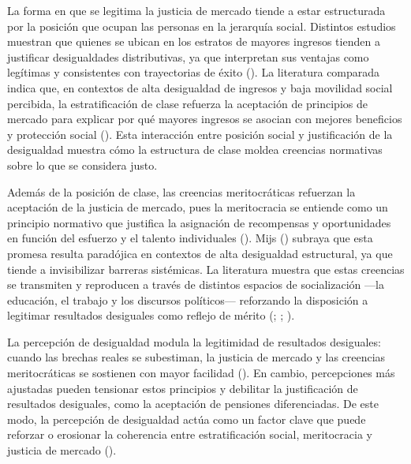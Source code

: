 \documentclass[
  12pt,
  letterpaper,
  DIV=11,
  numbers=noendperiod]{scrartcl}
\begin{document}
La forma en que se legitima la justicia de mercado tiende a estar
estructurada por la posición que ocupan las personas en la jerarquía
social. Distintos estudios muestran que quienes se ubican en los
estratos de mayores ingresos tienden a justificar desigualdades
distributivas, ya que interpretan sus ventajas como legítimas y
consistentes con trayectorias de éxito
(). La literatura
comparada indica que, en contextos de alta desigualdad de ingresos y
baja movilidad social percibida, la estratificación de clase refuerza la
aceptación de principios de mercado para explicar por qué mayores
ingresos se asocian con mejores beneficios y protección social
(). Esta interacción entre
posición social y justificación de la desigualdad muestra cómo la
estructura de clase moldea creencias normativas sobre lo que se
considera justo.

Además de la posición de clase, las creencias meritocráticas refuerzan
la aceptación de la justicia de mercado, pues la meritocracia se
entiende como un principio normativo que justifica la asignación de
recompensas y oportunidades en función del esfuerzo y el talento
individuales (). Mijs
() subraya que esta promesa
resulta paradójica en contextos de alta desigualdad estructural, ya que
tiende a invisibilizar barreras sistémicas. La literatura muestra que
estas creencias se transmiten y reproducen a través de distintos
espacios de socialización ---la educación, el trabajo y los discursos
políticos--- reforzando la disposición a legitimar resultados desiguales
como reflejo de mérito
(;
;
).

La percepción de desigualdad modula la legitimidad de resultados
desiguales: cuando las brechas reales se subestiman, la justicia de
mercado y las creencias meritocráticas se sostienen con mayor facilidad
(). En cambio, percepciones más ajustadas pueden tensionar estos
principios y debilitar la justificación de resultados desiguales, como
la aceptación de pensiones diferenciadas. De este modo, la percepción de
desigualdad actúa como un factor clave que puede reforzar o erosionar la
coherencia entre estratificación social, meritocracia y justicia de
mercado ().
\end{document}
